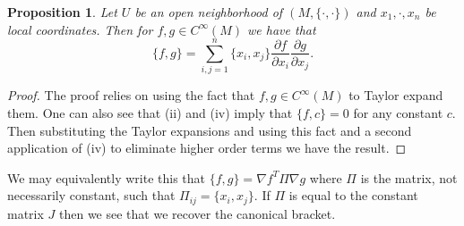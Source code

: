 \documentclass[psamsfonts,12pt]{amsart}
\newcommand\0{\mathbf{0}}
\theoremstyle{plain}
\newtheorem{prop}[thm]{Proposition}
\theoremstyle{definition}
\newcommand{\sG}{\mathcal{G}}
\newcommand{\sP}{\mathcal{P}}
\begin{document}
\begin{prop}
Let $U$ be an open neighborhood of $(M,\{\cdot,\cdot\})$ and $x_1,\cdot,x_n$ be local coordinates.  Then for $f,g\in C^\infty (M)$ we have that
\[
\{f,g\}=\sum_{i,j=1}^{n}{\{x_i,x_j\} \frac{\partial f}{\partial x_i} \frac{\partial g}{\partial x_j}}.
\]
\end{prop}
\begin{proof}

The proof relies on using the fact that $f,g\in C^\infty(M)$ to Taylor expand them.  One can also see that (ii) and (iv) imply that $\{f,c\}=0$ for any constant $c$.  Then substituting the Taylor expansions and using this fact and a second application of (iv) to eliminate higher order terms we have the result.
\end{proof}

We may equivalently write this that $\{f,g\}=\nabla f^T \Pi \nabla g$ where $\Pi$ is the matrix, not necessarily constant, such that $\Pi_{ij}=\{x_i,x_j\}$.  If $\Pi$ is equal to the constant matrix $J$ then we see that we recover the canonical bracket.
\end{document}
